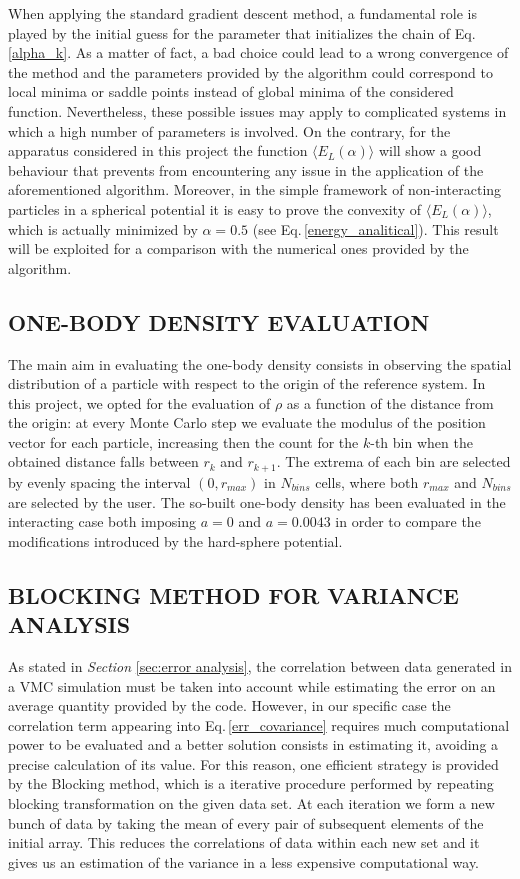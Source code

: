 When applying the standard gradient descent method, a fundamental role is played by the initial guess for the parameter that initializes the chain of Eq.\,\ref{alpha_k}. As a matter of fact, a bad choice could lead to a wrong convergence of the method and the parameters provided by the algorithm could correspond to local minima or saddle points instead of global minima of the considered function. Nevertheless, these possible issues may apply to complicated systems in which a high number of parameters is involved. On the contrary, for the apparatus considered in this project the function $\langle E_L(\alpha) \rangle$ will show a good behaviour that prevents from encountering any issue in the application of the aforementioned algorithm. Moreover, in the simple framework of non-interacting particles in a spherical potential it is easy to prove the convexity of $\langle E_L(\alpha) \rangle$, which is actually minimized by $\alpha=0.5$ (see Eq.\,\ref{energy_analitical}). This result will be exploited for a comparison with the numerical ones provided by the algorithm. 



\subsection{ONE-BODY DENSITY EVALUATION}
The main aim in evaluating the one-body density consists in observing the spatial distribution of a particle with respect to the origin of the reference system. In this project, we opted for the evaluation of $\rho$ as a function of the distance from the origin: at every Monte Carlo step we evaluate the modulus of the position vector for each particle, increasing then the count for the $k$-th bin when the obtained distance falls between $r_k$ and $r_{k+1}$. The extrema of each bin are selected by evenly spacing the interval $(0, r_{max})$ in $N_{bins}$ cells, where both $r_{max}$ and $N_{bins}$ are selected by the user. The so-built one-body density has been evaluated in the interacting case both imposing $a=0$ and $a=0.0043$ in order to compare the modifications introduced by the hard-sphere potential.


\subsection{BLOCKING METHOD FOR VARIANCE ANALYSIS} \label{variance}
As stated in \textit{Section} \ref{sec:error analysis}, the correlation between data generated in a VMC simulation must be taken into account while estimating the error on an average quantity provided by the code. However, in our specific case the correlation term appearing into Eq.\,\ref{err_covariance} requires much computational power to be evaluated and a better solution consists in estimating it, avoiding a precise calculation of its value. For this reason, one efficient strategy is provided by the Blocking method, which is a iterative procedure performed by repeating blocking transformation on the given data set. At each iteration we form a new bunch of data by taking the mean of every pair of subsequent elements of the initial array. This reduces the correlations of data within each new set and it gives us an estimation of the variance in a less expensive computational way. 

